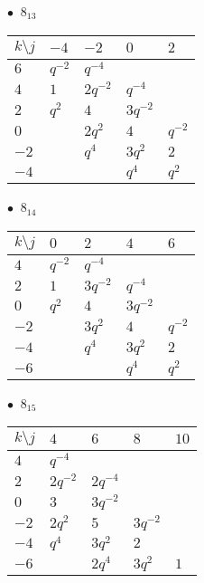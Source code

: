 %
\begin{minipage}{\linewidth}
$\bullet\ $ $8_{13}$ \vspace{0.5em} \\
\begin{tabular}{l|llll}
$k \setminus j$ & $-4$ & $-2$ & $0$ & $2$ \\
\hline
$6$ & $q^{-2}$ & $q^{-4}$ &  &  \\
$4$ & $1$ & $2q^{-2}$ & $q^{-4}$ &  \\
$2$ & $q^{2}$ & $4$ & $3q^{-2}$ &  \\
$0$ &  & $2q^{2}$ & $4$ & $q^{-2}$ \\
$-2$ &  & $q^{4}$ & $3q^{2}$ & $2$ \\
$-4$ &  &  & $q^{4}$ & $q^{2}$ \\
\end{tabular}
\vspace{2em}
\end{minipage}
%
\begin{minipage}{\linewidth}
$\bullet\ $ $8_{14}$ \vspace{0.5em} \\
\begin{tabular}{l|llll}
$k \setminus j$ & $0$ & $2$ & $4$ & $6$ \\
\hline
$4$ & $q^{-2}$ & $q^{-4}$ &  &  \\
$2$ & $1$ & $3q^{-2}$ & $q^{-4}$ &  \\
$0$ & $q^{2}$ & $4$ & $3q^{-2}$ &  \\
$-2$ &  & $3q^{2}$ & $4$ & $q^{-2}$ \\
$-4$ &  & $q^{4}$ & $3q^{2}$ & $2$ \\
$-6$ &  &  & $q^{4}$ & $q^{2}$ \\
\end{tabular}
\vspace{2em}
\end{minipage}
%
\begin{minipage}{\linewidth}
$\bullet\ $ $8_{15}$ \vspace{0.5em} \\
\begin{tabular}{l|llll}
$k \setminus j$ & $4$ & $6$ & $8$ & $10$ \\
\hline
$4$ & $q^{-4}$ &  &  &  \\
$2$ & $2q^{-2}$ & $2q^{-4}$ &  &  \\
$0$ & $3$ & $3q^{-2}$ &  &  \\
$-2$ & $2q^{2}$ & $5$ & $3q^{-2}$ &  \\
$-4$ & $q^{4}$ & $3q^{2}$ & $2$ &  \\
$-6$ &  & $2q^{4}$ & $3q^{2}$ & $1$ \\
\end{tabular}
\vspace{2em}
\end{minipage}
